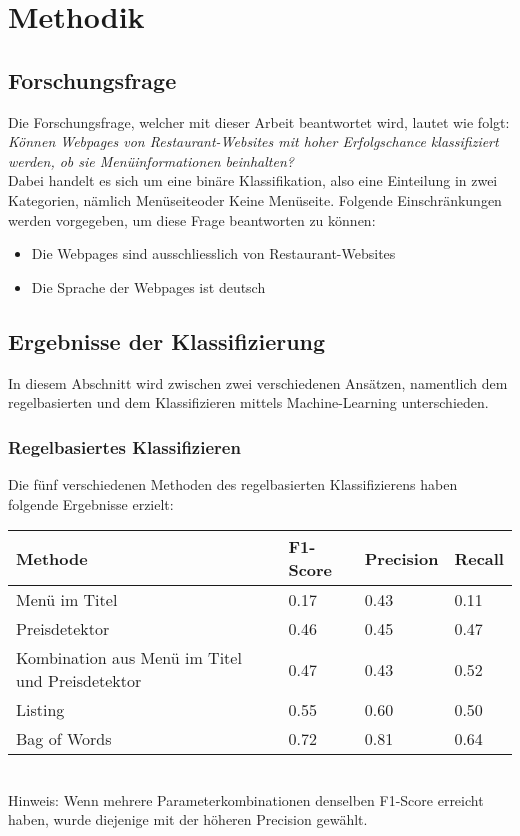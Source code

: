 \chapter{Methodik}
\section{Forschungsfrage}
Die Forschungsfrage, welcher mit dieser Arbeit beantwortet wird, lautet wie folgt:\\
\emph{Können Webpages von Restaurant-Websites mit hoher Erfolgschance klassifiziert werden, ob sie Menüinformationen beinhalten?}\\
Dabei handelt es sich um eine binäre Klassifikation, also eine Einteilung in zwei Kategorien, nämlich \glqq Menüseite\grqq oder \glqq Keine Menüseite\grqq.
Folgende Einschränkungen werden vorgegeben, um diese Frage beantworten zu können:
\begin{itemize}
	\item Die Webpages sind ausschliesslich von Restaurant-Websites
	\item Die Sprache der Webpages ist deutsch
\end{itemize}
\section{Ergebnisse der Klassifizierung}
In diesem Abschnitt wird zwischen zwei verschiedenen Ansätzen, namentlich dem regelbasierten und dem Klassifizieren mittels Machine-Learning unterschieden.
\subsection{Regelbasiertes Klassifizieren}
Die fünf verschiedenen Methoden des regelbasierten Klassifizierens haben folgende Ergebnisse erzielt:\\
\begin{tabular}{|l|l|l|l|}
	\hline
	Methode & F1-Score & Precision & Recall\\
	\hline
	Menü im Titel & 0.17 & 0.43 & 0.11 \\
	Preisdetektor & 0.46 & 0.45 & 0.47 \\
	Kombination aus Menü im Titel und Preisdetektor & 0.47 & 0.43 & 0.52\\
	Listing & 0.55 & 0.60 & 0.50\\
	Bag of Words & 0.72 & 0.81 & 0.64\\
	\hline
\end{tabular}\\
Hinweis: Wenn mehrere Parameterkombinationen denselben F1-Score erreicht haben, wurde diejenige mit der höheren Precision gewählt.
